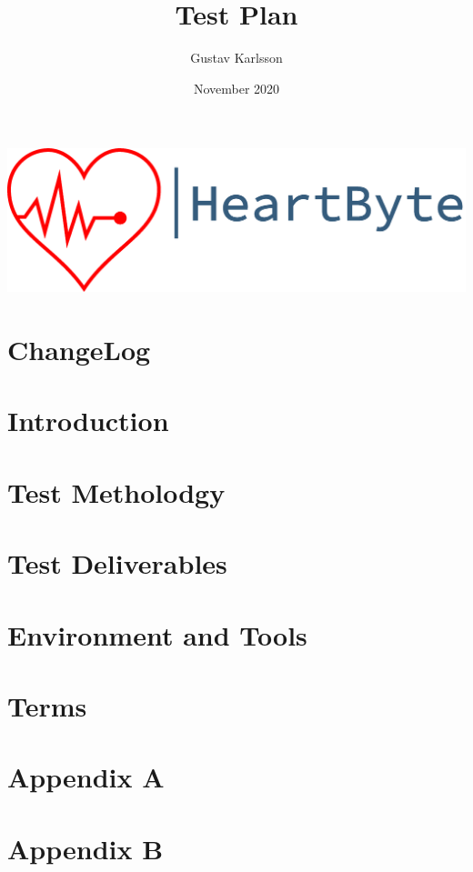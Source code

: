 \documentclass{article}
\title{Test Plan}
\author{Gustav Karlsson }
\date{November 2020}
\begin{document}
\maketitle
\vfill
\includegraphics[width=\linewidth]{Pictures/logo_heartbyte_transparent_v_1_1 (1)}

    \vfill
\clearpage


\section*{ChangeLog}


\clearpage
\section{Introduction}


\section{Test Metholodgy}


\section{Test Deliverables}

\section{Environment and Tools}

\section{Terms}

\section*{Appendix A}

\section*{Appendix B}
\end{document}
